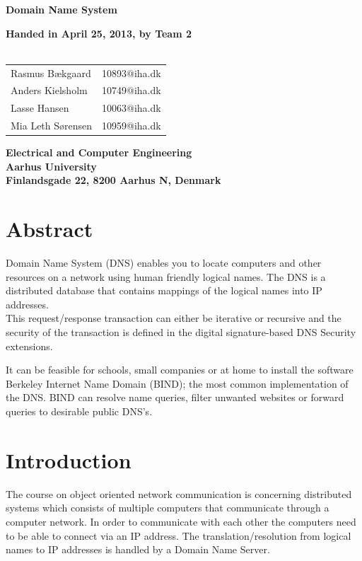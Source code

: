 \documentclass[a4paper,10pt]{report}
\begin{document}
\begin{titlepage}
\begin{center}
{\LARGE \textbf{Domain Name System}}


\vspace{4cm}
\textbf{Handed in April 25, 2013, by Team 2}\\~\\
\begin{tabular}{ll}
Rasmus Bækgaard  & 10893@iha.dk \\
Anders Kielsholm  & 10749@iha.dk \\
Lasse Hansen  & 10063@iha.dk \\
Mia Leth Sørensen & 10959@iha.dk \\
\end{tabular}
\vfill
\textbf{Electrical and Computer Engineering}\\
\textbf{Aarhus University}\\
\textbf{Finlandsgade 22, 8200 Aarhus N, Denmark}
\end{center}
\end{titlepage}

\chapter*{Abstract}

Domain Name System (DNS) enables you to locate computers and other resources on a network using human friendly logical names. The DNS is a distributed database that contains mappings of the logical names into IP addresses.\\This request/response transaction can either be iterative or recursive and the security of the transaction is defined in the digital signature-based DNS Security extensions.


It can be feasible for schools, small companies or at home to install the software Berkeley Internet Name Domain (BIND); the most common implementation of the DNS. BIND can resolve name queries, filter unwanted websites or forward queries to desirable public DNS's.


\setcounter{tocdepth}{1}
\tableofcontents

\chapter{Introduction}
The course on object oriented network communication is concerning distributed systems which consists of multiple computers that communicate through a computer network. In order to communicate with each other the computers need to be able to connect via an IP address. The translation/resolution from logical names to IP addresses is handled by a Domain Name Server.\vspace{10pt}
\end{document}
